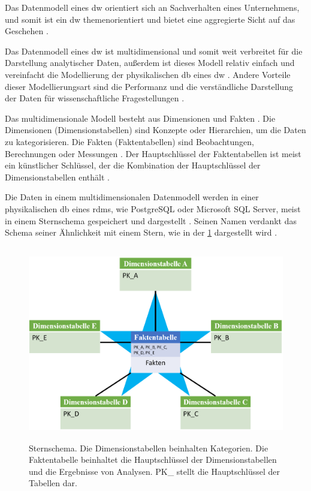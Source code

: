 Das Datenmodell eines \ac{dw} orientiert sich an Sachverhalten eines Unternehmens, und somit ist ein \ac{dw} themenorientiert und bietet eine aggregierte Sicht auf das Geschehen \cite{dwgoeken}.

Das Datenmodell eines \ac{dw} ist multidimensional und somit weit verbreitet für die Darstellung analytischer Daten, außerdem ist dieses Modell relativ einfach und vereinfacht die Modellierung der physikalischen \ac{db} eines \ac{dw} \cite{dwbauer}. Andere Vorteile dieser Modellierungsart sind die Performanz und die verständliche Darstellung der Daten für wissenschaftliche Fragestellungen \cite{dwtool}.

Das multidimensionale Modell besteht aus Dimensionen und Fakten \cite{dworiginal}. Die Dimensionen (Dimensionstabellen) sind Konzepte oder Hierarchien, um die Daten zu kategorisieren. Die Fakten (Faktentabellen) sind Beobachtungen, Berechnungen oder Messungen \cite{dwtool}. Der Hauptschlüssel der Faktentabellen ist meist ein künstlicher Schlüssel, der die Kombination der Hauptschlüssel der Dimensionstabellen enthält \cite{dwbauer, dwtool}. 

Die Daten in einem multidimensionalen Datenmodell werden in einer physikalischen \ac{db} eines \ac{rdms}, wie PostgreSQL oder Microsoft SQL Server, meist in einem Sternschema gespeichert und dargestellt \cite{dworiginal}. Seinen Namen verdankt das Schema seiner Ähnlichkeit mit einem Stern, wie in der \ref{fig:starschema} dargestellt wird \cite{dwtool}.

\clearpage

\begin{figure}[ht]
	\centering
	\includegraphics[height=8.5cm]{figures/starschema}
	\caption[Sternschema]{Sternschema. Die Dimensionstabellen beinhalten Kategorien. Die Faktentabelle beinhaltet die Hauptschlüssel der Dimensionstabellen und die Ergebnisse von Analysen. \glqq PK\_\grqq{} stellt die Hauptschlüssel der Tabellen dar.}
	\label{fig:starschema}
\end{figure}
